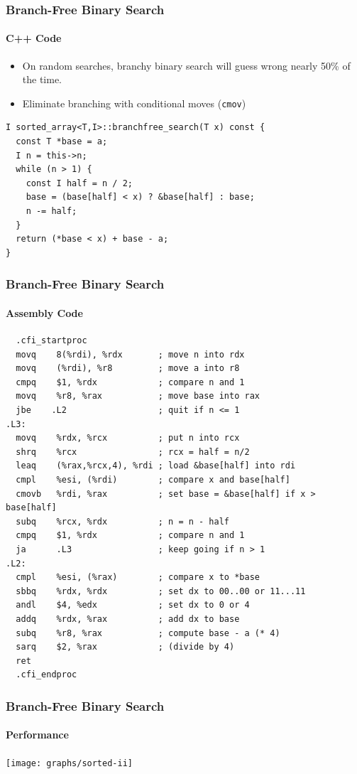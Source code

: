\documentclass[xcolor=dvipsnames]{beamer}
\begin{document}
\begin{frame}[fragile]
   \frametitle{Branch-Free Binary Search}
   \framesubtitle{C++ Code}

   \begin{itemize}
       \item On random searches, branchy binary search will guess 
                wrong nearly 50\% of the time.
       \item Eliminate branching with conditional moves (\texttt{\color{blue}cmov})
   \end{itemize}
\begin{verbatim}
I sorted_array<T,I>::branchfree_search(T x) const {
  const T *base = a;
  I n = this->n;
  while (n > 1) {
    const I half = n / 2;
    base = (base[half] < x) ? &base[half] : base;
    n -= half;
  }
  return (*base < x) + base - a;
}
\end{verbatim}
\end{frame}

\begin{frame}[fragile]
   \frametitle{Branch-Free Binary Search}
   \framesubtitle{Assembly Code}

\tiny
\begin{verbatim}
  .cfi_startproc
  movq    8(%rdi), %rdx       ; move n into rdx
  movq    (%rdi), %r8         ; move a into r8
  cmpq    $1, %rdx            ; compare n and 1
  movq    %r8, %rax           ; move base into rax
  jbe    .L2                  ; quit if n <= 1
.L3:
  movq    %rdx, %rcx          ; put n into rcx
  shrq    %rcx                ; rcx = half = n/2
  leaq    (%rax,%rcx,4), %rdi ; load &base[half] into rdi
  cmpl    %esi, (%rdi)        ; compare x and base[half]
  cmovb   %rdi, %rax          ; set base = &base[half] if x > base[half]
  subq    %rcx, %rdx          ; n = n - half
  cmpq    $1, %rdx            ; compare n and 1
  ja      .L3                 ; keep going if n > 1
.L2:
  cmpl    %esi, (%rax)        ; compare x to *base
  sbbq    %rdx, %rdx          ; set dx to 00..00 or 11...11
  andl    $4, %edx            ; set dx to 0 or 4 
  addq    %rdx, %rax          ; add dx to base
  subq    %r8, %rax           ; compute base - a (* 4)
  sarq    $2, %rax            ; (divide by 4)
  ret
  .cfi_endproc
\end{verbatim}
\end{frame}

\begin{frame}[fragile]
   \frametitle{Branch-Free Binary Search}
   \framesubtitle{Performance}

   \begin{center}
     \texttt{[image: graphs/sorted-ii]}
   \end{center}
\end{frame}
\end{document}
